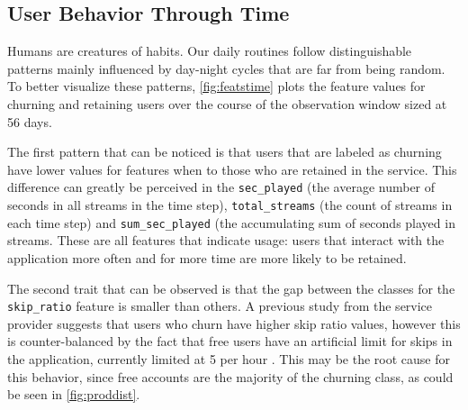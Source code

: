 \documentclass{kththesis}
\begin{document}
\subsection{User Behavior Through Time}

Humans are creatures of habits. Our daily routines follow distinguishable patterns mainly influenced by day-night cycles that are far from being random. To better visualize these patterns, \autoref{fig:featstime} plots the feature values for churning and retaining users over the course of the observation window sized at 56 days. 

The first pattern that can be noticed is that users that are labeled as churning have lower values for features when to those who are retained in the service. This difference can greatly be perceived in the \verb|sec_played| (the average number of seconds in all streams in the time step), \verb|total_streams| (the count of streams in each time step) and \verb|sum_sec_played| (the accumulating sum of seconds played in streams. These are all features that indicate usage: users that interact with the application more often and for more time are more likely to be retained.

The second trait that can be observed is that the gap between the classes for the \verb|skip_ratio| feature is smaller than others. A previous study from the service provider suggests that users who churn have higher skip ratio values, however this is counter-balanced by the fact that free users have an artificial limit for skips in the application, currently limited at 5 per hour . This may be the root cause for this behavior, since free accounts are the majority of the churning class, as could be seen in \autoref{fig:proddist}.
	
\end{document}

